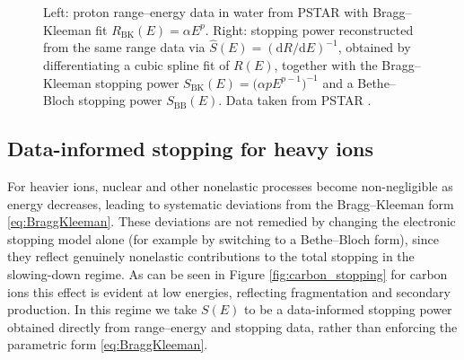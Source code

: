 \documentclass[final]{amsart}
\begin{document}
\begin{figure}[h!]
\begin{subfigure}{.49\linewidth}
  \end{subfigure}

  \caption{Left: proton range--energy data in water from PSTAR with
    Bragg--Kleeman fit $R_{\mathrm{BK}}(E)=\alpha E^p$. Right:
    stopping power reconstructed from the same range data via
    $\widehat S(E)=(\mathrm dR/\mathrm dE)^{-1}$, obtained by
    differentiating a cubic spline fit of $R(E)$, together with the
    Bragg--Kleeman stopping power $S_{\mathrm{BK}}(E)=\big(\alpha p
    E^{p-1}\big)^{-1}$ and a Bethe--Bloch stopping power
    $S_{\mathrm{BB}}(E)$. Data taken from PSTAR \cite{berger2005star}.}
  \label{fig:proton_fits}
\end{figure}

\subsection{Data-informed stopping for heavy ions}

For heavier ions, nuclear and other nonelastic processes become
non-negligible as energy decreases, leading to systematic deviations
from the Bragg--Kleeman form \eqref{eq:BraggKleeman}. These deviations
are not remedied by changing the electronic stopping model alone (for
example by switching to a Bethe--Bloch form), since they reflect
genuinely nonelastic contributions to the total stopping in the
slowing-down regime.  As can be seen in Figure
\ref{fig:carbon_stopping} for carbon ions this effect is evident at
low energies, reflecting fragmentation and secondary production. In
this regime we take $S(E)$ to be a data-informed stopping
power obtained directly from range--energy and stopping data, rather
than enforcing the parametric form \eqref{eq:BraggKleeman}.
\end{document}
